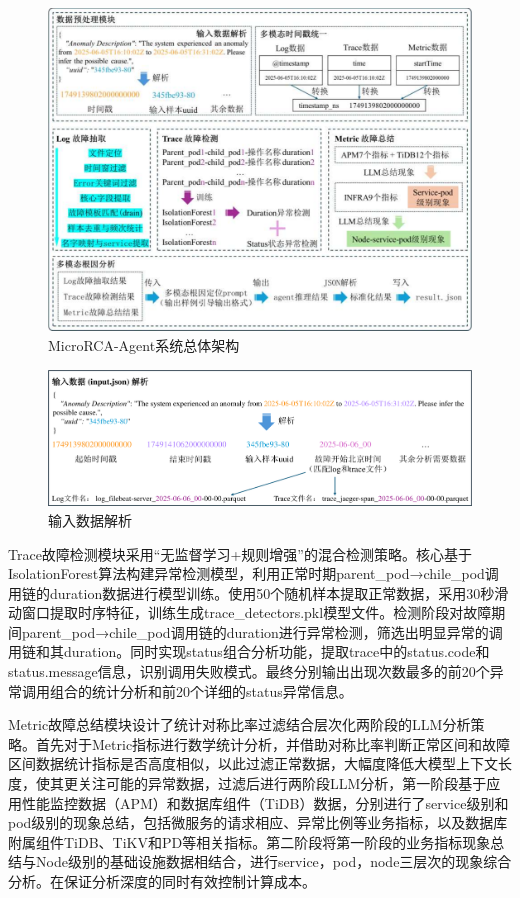\documentclass[11pt]{article}
\begin{document}
\begin{figure}[t]
    \centering
    \includegraphics[width=0.95\linewidth]{pics/fig1.pdf}
    \caption{MicroRCA-Agent系统总体架构}
    \label{fig1}
\end{figure}

\begin{figure}[htbp]
    \centering
    \includegraphics[width=0.95\linewidth]{pics/fig2.pdf}
    \caption{输入数据解析}
    \label{fig2}
\end{figure}

Trace故障检测模块采用“无监督学习+规则增强”的混合检测策略。核心基于IsolationForest\cite{liu2008isolation}算法构建异常检测模型，利用正常时期parent\_pod→chile\_pod调用链的duration数据进行模型训练。使用50个随机样本提取正常数据，采用30秒滑动窗口提取时序特征，训练生成trace\_detectors.pkl模型文件。检测阶段对故障期间parent\_pod→chile\_pod调用链的duration进行异常检测，筛选出明显异常的调用链和其duration。同时实现status组合分析功能，提取trace中的status.code和status.message信息，识别调用失败模式。最终分别输出出现次数最多的前20个异常调用组合的统计分析和前20个详细的status异常信息。

Metric故障总结模块设计了统计对称比率过滤结合层次化两阶段的LLM分析策略。首先对于Metric指标进行数学统计分析，并借助对称比率判断正常区间和故障区间数据统计指标是否高度相似，以此过滤正常数据，大幅度降低大模型上下文长度，使其更关注可能的异常数据，过滤后进行两阶段LLM分析，第一阶段基于应用性能监控数据（APM）和数据库组件（TiDB）数据，分别进行了service级别和pod级别的现象总结，包括微服务的请求相应、异常比例等业务指标，以及数据库附属组件TiDB、TiKV和PD等相关指标。第二阶段将第一阶段的业务指标现象总结与Node级别的基础设施数据相结合，进行service，pod，node三层次的现象综合分析。在保证分析深度的同时有效控制计算成本。
\end{document}
